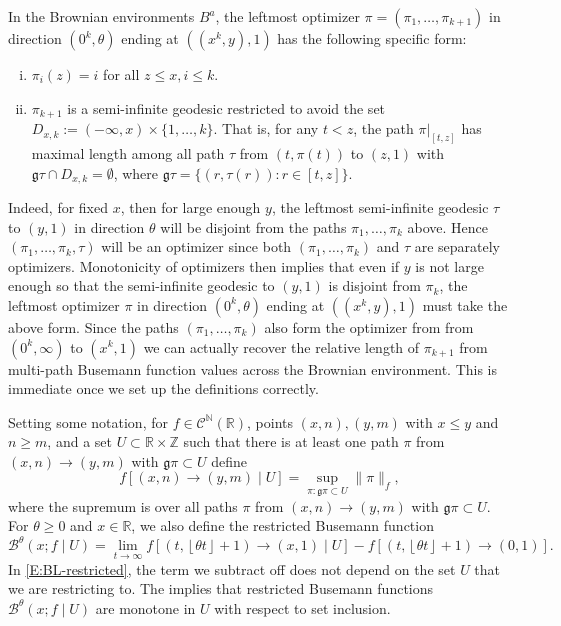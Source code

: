 \documentclass[11pt]{article}
\newcommand{\Z}{\mathbb{Z}}
\newcommand{\N}{\mathbb{N}}
\newcommand{\R}{\mathbb{R}}
\newcommand{\fl}[1]{{\left\lfloor #1 \right\rfloor}}
\newcommand{\cB}{\mathcal{B}}
\newcommand{\cC}{\mathcal{C}}
\newcommand{\X}{\times}
\theoremstyle{definition} %
\theoremstyle{remark} %
\begin{document}
In the Brownian environments $B^a$, the leftmost optimizer $\pi = (\pi_1, \dots, \pi_{k+1})$ in direction $(0^k, \theta)$ ending at $((x^k, y), 1)$ has the following specific form:
\begin{enumerate}[i.]
	\item $\pi_i(z) = i$ for all $z \le x, i \le k$.
	\item $\pi_{k+1}$ is a semi-infinite geodesic restricted to avoid the set $D_{x, k} := (-\infty, x) \times \{1, \dots, k\}$. That is, for any $t < z$, the path $\pi|_{[t, z]}$ has maximal length among all path $\tau$ from $(t, \pi(t))$ to $(z, 1)$ with $\mathfrak g \tau \cap D_{x, k} = \emptyset$, where $\mathfrak g \tau = \{(r, \tau(r)) : r \in [t, z]\}$.
\end{enumerate}
Indeed, for fixed $x$, then for large enough $y$, the leftmost semi-infinite geodesic $\tau$ to $(y, 1)$ in direction $\theta$ will be disjoint from the paths $\pi_1, \dots, \pi_k$ above. Hence $(\pi_1, \dots, \pi_k, \tau)$ will be an optimizer since both $(\pi_1, \dots, \pi_k)$ and $\tau$ are separately optimizers. Monotonicity of optimizers then implies that even if $y$ is not large enough so that the semi-infinite geodesic to $(y, 1)$ is disjoint from $\pi_k$, the leftmost optimizer $\pi$ in direction $(0^k, \theta)$ ending at $((x^k, y), 1)$ must take the above form.
Since the paths $(\pi_1, \dots, \pi_k)$ also form the optimizer from  from $(0^k, \infty)$ to $(x^k, 1)$ we can actually recover the relative length of $\pi_{k+1}$ from multi-path Busemann function values across the Brownian environment. This is immediate once we set up the definitions correctly.

Setting some notation, for $f \in \cC^\N(\R)$, points $(x, n), (y, m)$ with $x \le y$ and $n \ge m$, and a set $U \subset \R \X \Z$ such that there is at least one path $\pi$ from $(x, n) \to (y, m)$ with $\mathfrak g \pi \subset U$ define
$$
f[(x, n) \to (y, m) \mid U] = \sup_{\pi : \mathfrak g \pi \subset U} \|\pi\|_f,
$$
where the supremum is over all paths $\pi$ from $(x, n) \to (y, m)$ with $\mathfrak g \pi \subset U$. For $\theta \ge 0$ and $x \in \R$, we also define the restricted Busemann function
\begin{equation}
\label{E:BL-restricted}
\cB^\theta(x ; f \mid U) = \lim_{t \to \infty} f[(t, \fl{\theta t} + 1) \to (x, 1) \mid U] - f[(t, \fl{\theta  t} + 1) \to (0, 1)].
\end{equation}
In \eqref{E:BL-restricted}, the term we subtract off does not depend on the set $U$ that we are restricting to. The implies that restricted Busemann functions $\cB^\theta(x ; f \mid U)$ are monotone in $U$ with respect to set inclusion.
\end{document}
